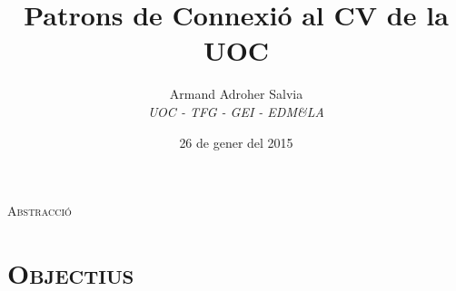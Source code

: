 \documentclass[xcolor=x11names,
								compress,
								aspectratio=1610]{beamer}
\theoremstyle{definition}%
\renewcommand{\(}{\begin{columns}}
\renewcommand{\)}{\end{columns}}
\newcommand{\<}[1]{\begin{column}{#1}}
\renewcommand{\>}{\end{column}}
\begin{document}
\begin{frame}
\title{Patrons de Connexió al CV de la UOC}
\author{
	Armand Adroher Salvia\\
	{\it UOC - TFG - GEI - EDM\&LA}\\
}
\date{
	26 de gener del 2015
}
\titlepage
\end{frame}

\begin{frame}{}
\begin{lrbox}{\longestsec}{\scshape Abstracció}\end{lrbox}%
  \setlength{\leftskip}{\dimexpr.45\textwidth-.4\wd\longestsec\relax}
\tableofcontents[hideallsubsections]
\end{frame}

\section{\scshape Objectius}
\end{document}
